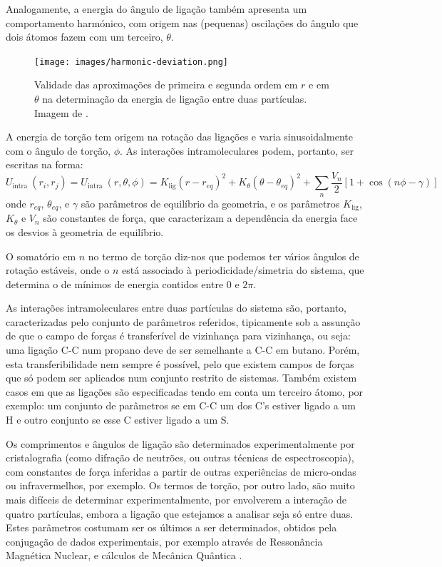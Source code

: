 \documentclass[12pt,a4paper]{article}
\begin{document}
	Analogamente, a energia do ângulo de ligação também apresenta um comportamento harmónico, com origem nas (pequenas) oscilações do ângulo que dois átomos fazem com um terceiro, $\theta$.

	\begin{figure}[h]
		\centering
		\texttt{[image: images/harmonic-deviation.png]}
		\caption{Validade das aproximações de primeira e segunda ordem em $r$ e em $\theta$ na determinação da energia de ligação entre duas partículas. Imagem de \cite{2021Harmonic}.}
		\label{fig:intro:harmonic-deviation}
	\end{figure}
	 
	 A energia de torção tem origem na rotação das ligações e varia sinusoidalmente com o ângulo de torção, $\phi$. As interações intramoleculares podem, portanto, ser escritas na forma:
	\begin{equation}
		U_{\text {intra }}\left(r_i,r_j\right)=U_{\text {intra }}\left(r,\theta,\phi\right)= K_{\textrm{lig}}\left(r-r_{e q}\right)^{2}+ K_{\theta}\left(\theta-\theta_{e q}\right)^{2}+ \sum_{n} \frac{V_{n}}{2}[1+\cos (n \phi-\gamma)]
	\end{equation}
	onde $r_{eq}$, $\theta_{eq}$, e $\gamma$ são parâmetros de equilíbrio da geometria, e os parâmetros $K_\textrm{lig}$, $K_\theta$ e $V_n$ são constantes de força, que caracterizam a dependência da energia face os desvios à geometria de equilíbrio. 
	
	O somatório em $n$ no termo de torção diz-nos que podemos ter vários ângulos de rotação estáveis, onde o $n$ está associado à periodicidade/simetria do sistema, que determina o de mínimos de energia contidos entre $0$ e $2\pi$.
	
	As interações intramoleculares entre duas partículas do sistema são, portanto, caracterizadas pelo conjunto de parâmetros referidos, tipicamente sob a assunção de que o campo de forças é transferível de vizinhança para vizinhança, ou seja: uma ligação C-C num propano deve de ser semelhante a C-C em butano. Porém, esta transferibilidade nem sempre é possível, pelo que existem campos de forças que só podem ser aplicados num conjunto restrito de sistemas. Também existem casos em que as ligações são especificadas tendo em conta um terceiro átomo, por exemplo: um conjunto de parâmetros se em C-C um dos C's estiver ligado a um H e outro conjunto se esse C estiver ligado a um S.
	
	Os comprimentos e ângulos de ligação são determinados experimentalmente por cristalografia (como difração de neutrões, ou outras técnicas de espectroscopia), com constantes de força inferidas a partir de outras experiências de micro-ondas ou infravermelhos, por exemplo. Os termos de torção, por outro lado, são muito mais difíceis de determinar experimentalmente, por envolverem a interação de quatro partículas, embora a ligação que estejamos a analisar seja só entre duas. Estes parâmetros costumam ser os últimos a ser determinados, obtidos pela conjugação de dados experimentais, por exemplo através de Ressonância Magnética Nuclear, e cálculos de Mecânica Quântica \cite{weinerNewForceField1984,cheathamMolecularModelingNucleic2001,cornellSecondGenerationForce1995}.
\end{document}
